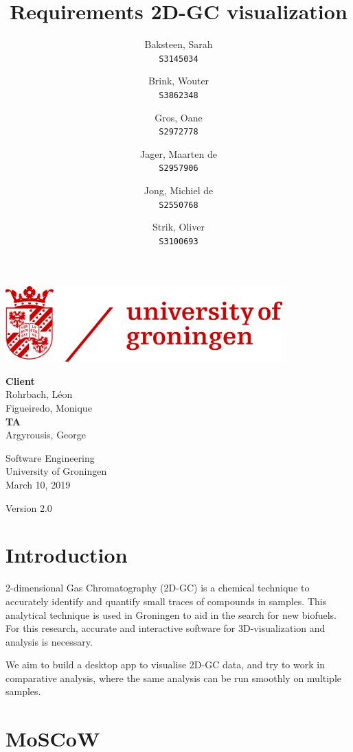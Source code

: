 \documentclass{article}
\title{Requirements 2D-GC visualization}
\author{
  Baksteen, Sarah\\
  \texttt{S3145034}
  \and
  Brink, Wouter\\
  \texttt{S3862348}
  \and
  Gros, Oane\\
  \texttt{S2972778}
  \and
  Jager, Maarten de \\
  \texttt{S2957906}
  \and
  Jong, Michiel de \\
  \texttt{S2550768}
  \and
  Strik, Oliver\\
  \texttt{S3100693}
}
\date{}
\begin{document}
\clearpage
\maketitle
\thispagestyle{empty}
\begin{center}
    \vfill
    \includegraphics[width=0.8\textwidth]{UG_logo.jpg}
    \vfill
    
    \Large
    \textbf{Client} \\
    Rohrbach, Léon \\
    Figueiredo, Monique \\
    
    \vspace{1cm}
    \textbf{TA} \\
    Argyrousis, George
    
    \vspace{2cm}
        Software Engineering \\
        University of Groningen \\
        March 10, 2019  \\
        \empty
        
        \vspace{1cm}
        Version 2.0
\end{center}

\newpage\setcounter{page}{1}
\section{Introduction}

2-dimensional Gas Chromatography (2D-GC) is a chemical technique to accurately identify and quantify small traces of compounds in samples. This analytical technique is used in Groningen to aid in the search for new biofuels. For this research, accurate and interactive software for 3D-visualization and analysis is necessary. 

We aim to build a desktop app to visualise 2D-GC data, and try to work in comparative analysis, where the same analysis can be run smoothly on multiple samples. 



\section{MoSCoW}
\end{document}
